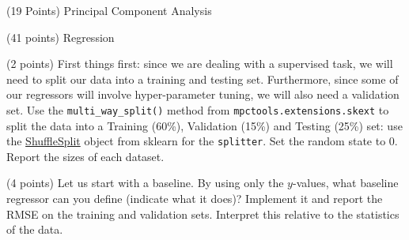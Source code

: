 \documentclass[12pt]{article}
\begin{document}
\begin{question}{(19 Points) Principal Component Analysis}
\begin{subquestion}
\end{subquestion}

\end{question}



\begin{question}{\label{Q_LR_BA}(41 points) Regression}





\begin{subquestion}{(2 points) First things first: since we are dealing with a supervised task, we will need to split our data into a training and testing set. Furthermore, since some of our regressors will involve hyper-parameter tuning, we will also need a validation set. Use the \texttt{multi\_way\_split()} method from \texttt{mpctools.extensions.skext} to split the data into a Training (60\%), Validation (15\%) and Testing (25\%) set: use the \href{https://scikit-learn.org/stable/modules/generated/sklearn.model_selection.ShuffleSplit.html}{ShuffleSplit} object from sklearn for the \texttt{splitter}. Set the random state to 0.  Report the sizes of each dataset.}






\end{subquestion}

\begin{subquestion}{(4 points) Let us start with a baseline. By using only the $y$-values, what baseline regressor can you define (indicate what it does)? Implement it and report the RMSE on the training and validation sets. Interpret this relative to the statistics of the data.}







\end{subquestion}
\end{question}
\end{document}
